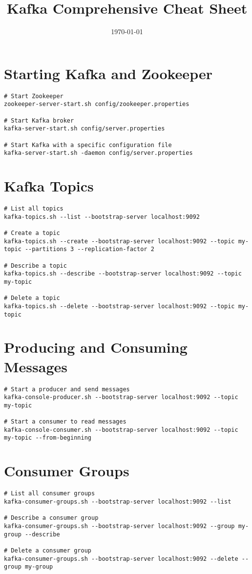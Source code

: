 \documentclass[11pt]{article}
\title{\textbf{Kafka Comprehensive Cheat Sheet}}
\author{}
\date{\today}
\begin{document}
    \maketitle

    \section*{Starting Kafka and Zookeeper}
    \begin{lstlisting}[style=kafkaStyle]
# Start Zookeeper
zookeeper-server-start.sh config/zookeeper.properties

# Start Kafka broker
kafka-server-start.sh config/server.properties

# Start Kafka with a specific configuration file
kafka-server-start.sh -daemon config/server.properties
    \end{lstlisting}

    \section*{Kafka Topics}
    \begin{lstlisting}[style=kafkaStyle]
# List all topics
kafka-topics.sh --list --bootstrap-server localhost:9092

# Create a topic
kafka-topics.sh --create --bootstrap-server localhost:9092 --topic my-topic --partitions 3 --replication-factor 2

# Describe a topic
kafka-topics.sh --describe --bootstrap-server localhost:9092 --topic my-topic

# Delete a topic
kafka-topics.sh --delete --bootstrap-server localhost:9092 --topic my-topic
    \end{lstlisting}

    \section*{Producing and Consuming Messages}
    \begin{lstlisting}[style=kafkaStyle]
# Start a producer and send messages
kafka-console-producer.sh --bootstrap-server localhost:9092 --topic my-topic

# Start a consumer to read messages
kafka-console-consumer.sh --bootstrap-server localhost:9092 --topic my-topic --from-beginning
    \end{lstlisting}

    \section*{Consumer Groups}
    \begin{lstlisting}[style=kafkaStyle]
# List all consumer groups
kafka-consumer-groups.sh --bootstrap-server localhost:9092 --list

# Describe a consumer group
kafka-consumer-groups.sh --bootstrap-server localhost:9092 --group my-group --describe

# Delete a consumer group
kafka-consumer-groups.sh --bootstrap-server localhost:9092 --delete --group my-group
    \end{lstlisting}
\end{document}
